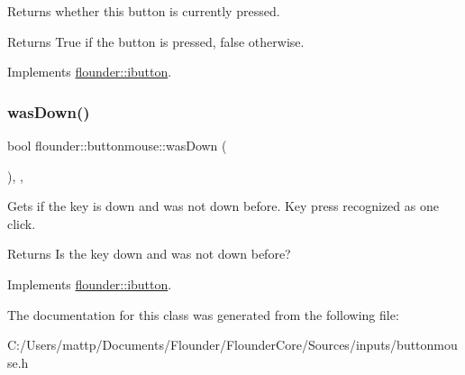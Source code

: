 Returns whether this button is currently pressed. 

\begin{DoxyReturn}{Returns}
True if the button is pressed, false otherwise. 
\end{DoxyReturn}


Implements \hyperlink{classflounder_1_1ibutton_ab64fd22a75ea66ce67fd9b1ad34fd837}{flounder\+::ibutton}.

\mbox{\label{classflounder_1_1buttonmouse_a7dad01481ebb01755db054a0acbc8159}} 
\subsubsection{\texorpdfstring{was\+Down()}{wasDown()}}
{\footnotesize\ttfamily bool flounder\+::buttonmouse\+::was\+Down (\begin{DoxyParamCaption}{ }\end{DoxyParamCaption})\hspace{0.3cm}{\ttfamily [inline]}, {\ttfamily [override]}, {\ttfamily [virtual]}}



Gets if the key is down and was not down before. Key press recognized as one click. 

\begin{DoxyReturn}{Returns}
Is the key down and was not down before? 
\end{DoxyReturn}


Implements \hyperlink{classflounder_1_1ibutton_a5fb7b3493c0ea0e67bb9defc272da0d3}{flounder\+::ibutton}.



The documentation for this class was generated from the following file\+:\begin{DoxyCompactItemize}
\item 
C\+:/\+Users/mattp/\+Documents/\+Flounder/\+Flounder\+Core/\+Sources/inputs/buttonmouse.\+h\end{DoxyCompactItemize}
